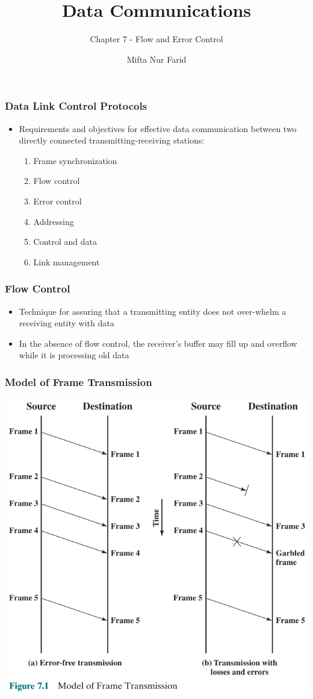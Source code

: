 \documentclass[pdflatex,compress]{beamer}
\title{Data Communications}
\subtitle{Chapter 7 - Flow and Error Control}
\author{Mifta Nur Farid}
\begin{document}
\maketitle

\begin{frame}
	\frametitle{Data Link Control Protocols}
	\begin{itemize}
		\item Requirements and objectives for effective data communication between two directly connected transmitting-receiving stations:
		\begin{enumerate}
			\item Frame synchronization
			\item Flow control
			\item Error control
			\item Addressing
			\item Control and data
			\item Link management
		\end{enumerate}
	\end{itemize}
\end{frame}

\begin{frame}
	\frametitle{Flow Control}
	\begin{itemize}
		\item Technique for assuring that a transmitting entity does not over-whelm a receiving entity with data
		\item In the absence of flow control, the receiver’s buffer may fill up and overflow while it is processing old data
	\end{itemize}
\end{frame}

\begin{frame}
	\frametitle{Model of Frame Transmission}
	\begin{center}
		\includegraphics[width=0.6\linewidth]{img/img01}
	\end{center}
\end{frame}
\end{document}
